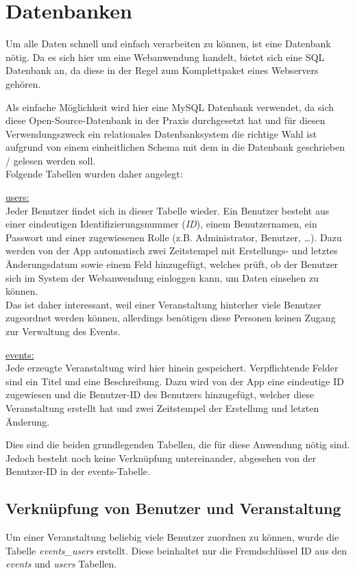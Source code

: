 \section{Datenbanken}
Um alle Daten schnell und einfach verarbeiten zu können, ist eine Datenbank nötig. Da es sich hier um eine Webanwendung handelt, bietet sich eine SQL Datenbank an, da diese in der Regel zum Komplettpaket eines Webservers gehören.\par

Als einfache Möglichkeit wird hier eine MySQL Datenbank verwendet, da sich diese Open-Source-Datenbank in der Praxis durchgesetzt hat und für diesen Verwendungszweck ein relationales Datenbanksystem die richtige Wahl ist aufgrund von einem einheitlichen Schema mit dem in die Datenbank geschrieben / gelesen werden soll.\\
Folgende Tabellen wurden daher angelegt:\par

\underline{users:}\\
Jeder Benutzer findet sich in dieser Tabelle wieder. Ein Benutzer besteht aus einer eindeutigen Identifizierungsnummer (\emph{ID}), einem Benutzernamen, ein Passwort und einer zugewiesenen Rolle (z.B. Administrator, Benutzer, \dots). Dazu werden von der App automatisch zwei Zeitstempel mit Erstellungs- und letztes Änderungsdatum sowie einem Feld hinzugefügt, welches prüft, ob der Benutzer sich im System der Webanwendung einloggen kann, um Daten einsehen zu können.\\
Das ist daher interessant, weil einer Veranstaltung hinterher viele Benutzer zugeordnet werden können, allerdings benötigen diese Personen keinen Zugang zur Verwaltung des Events.

\underline{events:}\\
Jede erzeugte Veranstaltung wird hier hinein gespeichert. Verpflichtende Felder sind ein Titel und eine Beschreibung. Dazu wird von der App eine eindeutige ID zugewiesen und die Benutzer-ID des Benutzers hinzugefügt, welcher diese Veranstaltung erstellt hat und zwei Zeitstempel der Erstellung und letzten Änderung.\par

Dies sind die beiden grundlegenden Tabellen, die für diese Anwendung nötig sind. Jedoch besteht noch keine Verknüpfung untereinander, abgesehen von der Benutzer-ID in der events-Tabelle.

\subsection{Verknüpfung von Benutzer und Veranstaltung}
Um einer Veranstaltung beliebig viele Benutzer zuordnen zu können, wurde die Tabelle \emph{events\_users} erstellt. Diese beinhaltet nur die Fremdschlüssel ID aus den \emph{events} und \emph{users} Tabellen.

